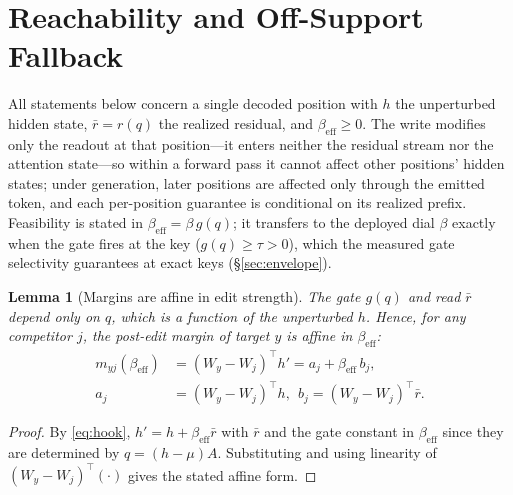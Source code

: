 \documentclass[10pt,twocolumn]{article}
\newtheorem{lemma}{Lemma}
\theoremstyle{remark}
\begin{document}
\section{Reachability and Off-Support Fallback}
\label{sec:theory}

All statements below concern a single decoded position with $h$ the unperturbed
hidden state, $\bar r=r(q)$ the realized residual, and $\beta_{\mathrm{eff}}\ge 0$.
The write modifies only the readout at that position---it enters neither the
residual stream nor the attention state---so within a forward pass it cannot
affect other positions' hidden states; under generation, later positions are
affected only through the emitted token, and each per-position guarantee is
conditional on its realized prefix. Feasibility is stated in
$\beta_{\mathrm{eff}}=\beta\,g(q)$; it transfers to the deployed dial $\beta$
exactly when the gate fires at the key ($g(q)\ge\tau>0$), which the measured gate
selectivity guarantees at exact keys (\S\ref{sec:envelope}).

\begin{lemma}[Margins are affine in edit strength]
\label{lem:affine}
The gate $g(q)$ and read $\bar r$ depend only on $q$, which is a function of the
unperturbed $h$. Hence, for any competitor $j$, the post-edit margin of target
$y$ is affine in $\beta_{\mathrm{eff}}$:
\[
\begin{aligned}
m_{yj}(\beta_{\mathrm{eff}}) &= (W_y-W_j)^{\top}h' = a_j + \beta_{\mathrm{eff}}\,b_j,\\
a_j&=(W_y-W_j)^{\top}h,\ \ b_j=(W_y-W_j)^{\top}\bar r .
\end{aligned}
\]
\end{lemma}
\begin{proof}
By \eqref{eq:hook}, $h'=h+\beta_{\mathrm{eff}}\bar r$ with $\bar r$ and the gate
constant in $\beta_{\mathrm{eff}}$ since they are determined by $q=(h-\mu)A$.
Substituting and using linearity of $(W_y-W_j)^{\top}(\cdot)$ gives the stated
affine form.
\end{proof}
\end{document}
